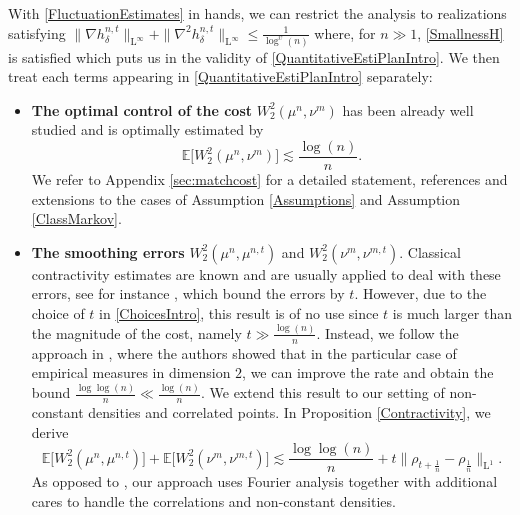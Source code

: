 \documentclass[11pt,a4paper,oneside]{amsart}
\numberwithin{equation}{section}
\newcommand{\LL}{\mathrm{L}}
\begin{document}
With \eqref{FluctuationEstimates} in hands, we can restrict the analysis to realizations satisfying $\|\nabla h^{n,t}_\delta\|_{\LL^{\infty}}+\|\nabla^2 h^{n,t}_\delta\|_{\LL^\infty}\leq\tfrac{1}{\log^{\upsilon}(n)}$ where, for $n\gg 1$, \eqref{SmallnessH} is satisfied which puts us in the validity of \eqref{QuantitativeEstiPlanIntro}. We then treat each terms appearing in \eqref{QuantitativeEstiPlanIntro} separately:
%
\begin{itemize}
%
\item \textbf{The optimal control of the cost} $W^2_2(\mu^n,\nu^m)$ has been already well studied and is optimally estimated by 
%
\begin{equation}\label{CostIntro}
%
\mathbb{E}\big[W^2_2(\mu^n,\nu^m)\big]\lesssim \frac{\log(n)}{n}.
%
\end{equation}
%
We refer to Appendix \ref{sec:matchcost} for a detailed statement, references and extensions to the cases of Assumption \ref{Assumptions} and Assumption \ref{ClassMarkov}.

%
\medskip
%

\item \textbf{The smoothing errors} $W^2_2(\mu^n,\mu^{n,t})$ and $W^2_2(\nu^m,\nu^{m,t})$. Classical contractivity estimates are known and are usually applied to deal with these errors, see for instance  \cite[Theorem 3]{erbar2015equivalence}, which bound the errors by $t$. However, due to the choice of $t$ in \eqref{ChoicesIntro}, this result is of no use since $t$ is much larger than the magnitude of the cost, namely $t\gg \frac{\log(n)}{n}$. Instead, we follow the approach in \cite{ambrosio2019finer}, where the authors showed that in the particular case of empirical measures in dimension $2$, we can improve the rate and obtain the bound $\frac{\log\log(n)}{n}\ll \frac{\log(n)}{n}$. We extend this result to our setting of non-constant densities and correlated points. In Proposition \ref{Contractivity}, we derive
%
\begin{equation}\label{ContractivityEstimatesIntro}
%
\mathbb{E}\big[W^2_2(\mu^{n},\mu^{n,t})\big]+\mathbb{E}\big[W^2_2(\nu^{m},\nu^{m,t})\big]\lesssim \frac{\log\log(n)}{n}+t\|\rho_{t+\frac{1}{n}}-\rho_{\frac{1}{n}}\|_{\LL^1}.
%
\end{equation}
%
As opposed to \cite{ambrosio2019finer}, our approach uses Fourier analysis together with additional cares to handle the correlations and non-constant densities.

%
\medskip
%


\end{itemize}
\end{document}
